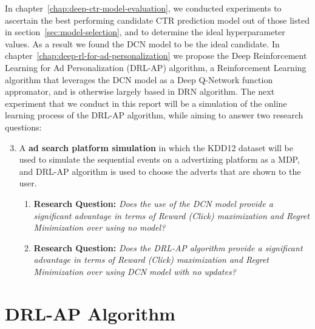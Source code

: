 \documentclass{mldsmsc}
\begin{document}
In chapter~\ref{chap:deep-ctr-model-evaluation}, we conducted experiments to ascertain the
best performing candidate CTR prediction model out of those listed in section~\ref{sec:model-selection},
and to determine the ideal hyperparameter values. As a result we found the DCN model to be the
ideal candidate. In chapter~\ref{chap:deep-rl-for-ad-personalization} we propose the Deep Reinforcement Learning
for Ad Personalization (DRL-AP) algorithm, a Reinforcement
Learning algorithm that leverages the DCN model as a Deep Q-Network function appromator, and is
otherwise largely based in DRN algorithm. The next experiment that we conduct in this report will
be a simulation of the online learning process of the DRL-AP algorithm, while aiming to answer two
research questions:
\begin{enumerate}
    \setcounter{enumi}{2}
    \item \label{exp:rl-sim} A \textbf{ad search platform simulation} in which the KDD12 dataset will be used to
    simulate the sequential events on a advertizing platform as a MDP, and DRL-AP algorithm
    is used to choose the adverts that are shown to the user.
    \begin{enumerate}
        \item \label{exp:dcn-model-advantage} \textbf{Research Question:} \emph{Does the use of the DCN model provide a significant
        advantage in terms of Reward (Click) maximization and Regret Minimization over using no model?}
        \item \label{exp:drl-ap-advantage} \textbf{Research Question:} \emph{Does the DRL-AP algorithm provide a significant
        advantage in terms of Reward (Click) maximization and Regret Minimization over using DCN model
        with no updates?}
    \end{enumerate}
\end{enumerate}

\section{DRL-AP Algorithm}
\end{document}
